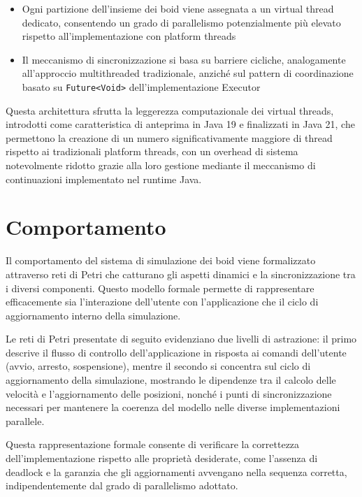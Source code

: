 \documentclass[a4paper,12pt]{report}
\begin{document}
\begin{itemize}
    \item Ogni partizione dell'insieme dei boid viene assegnata a un virtual thread dedicato, consentendo un grado di parallelismo potenzialmente più elevato rispetto all'implementazione con platform threads
    \item Il meccanismo di sincronizzazione si basa su barriere cicliche, analogamente all'approccio multithreaded tradizionale, anziché sul pattern di coordinazione basato su \texttt{Future<Void>} dell'implementazione Executor
\end{itemize}

Questa architettura sfrutta la leggerezza computazionale dei virtual threads, introdotti come caratteristica di anteprima in Java 19 e finalizzati in Java 21, che permettono la creazione di un numero significativamente maggiore di thread rispetto ai tradizionali platform threads, con un overhead di sistema notevolmente ridotto grazie alla loro gestione mediante il meccanismo di continuazioni implementato nel runtime Java.

\chapter{Comportamento}
Il comportamento del sistema di simulazione dei boid viene formalizzato attraverso reti di Petri che catturano gli aspetti dinamici e la sincronizzazione tra i diversi componenti. Questo modello formale permette di rappresentare efficacemente sia l'interazione dell'utente con l'applicazione che il ciclo di aggiornamento interno della simulazione.

Le reti di Petri presentate di seguito evidenziano due livelli di astrazione: il primo descrive il flusso di controllo dell'applicazione in risposta ai comandi dell'utente (avvio, arresto, sospensione), mentre il secondo si concentra sul ciclo di aggiornamento della simulazione, mostrando le dipendenze tra il calcolo delle velocità e l'aggiornamento delle posizioni, nonché i punti di sincronizzazione necessari per mantenere la coerenza del modello nelle diverse implementazioni parallele.

Questa rappresentazione formale consente di verificare la correttezza dell'implementazione rispetto alle proprietà desiderate, come l'assenza di deadlock e la garanzia che gli aggiornamenti avvengano nella sequenza corretta, indipendentemente dal grado di parallelismo adottato.
\end{document}
